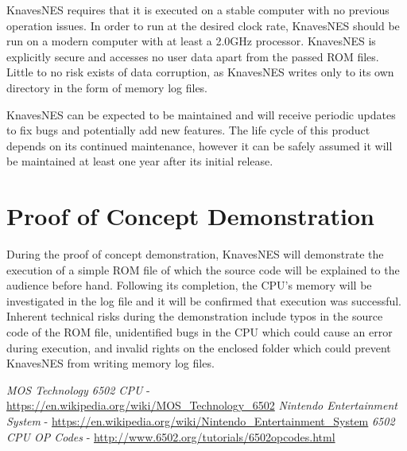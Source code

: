 \documentclass[12pt]{article}
\begin{document}
	KnavesNES requires that it is executed on a stable computer with no previous operation issues. In order to run at the desired clock rate, KnavesNES should be run on a modern computer with at least a 2.0GHz processor. KnavesNES is explicitly secure and accesses no user data apart from the passed ROM files. Little to no risk exists of data corruption, as KnavesNES writes only to its own directory in the form of memory log files. 

	KnavesNES can be expected to be maintained and will receive periodic updates to fix bugs and potentially add new features. The life cycle of this product depends on its continued maintenance, however it can be safely assumed it will be maintained at least one year after its initial release.
\section{Proof of Concept Demonstration}
	During the proof of concept demonstration, KnavesNES will demonstrate the execution of a simple ROM file of which the source code will be explained to the audience before hand. Following its completion, the CPU’s memory will be investigated in the log file and it will be confirmed that execution was successful. Inherent technical risks during the demonstration include typos in the source code of the ROM file, unidentified bugs in the CPU which could cause an error during execution, and invalid rights on the enclosed folder which could prevent KnavesNES from writing memory log files.
\clearpage

\hypertarget{refs}{}
\begin{thebibliography}{99}
 \emph{MOS Technology 6502 CPU} - \url{https://en.wikipedia.org/wiki/MOS_Technology_6502}
 \emph{Nintendo Entertainment System} - \url{https://en.wikipedia.org/wiki/Nintendo_Entertainment_System}
 \emph{6502 CPU OP Codes} - \url{http://www.6502.org/tutorials/6502opcodes.html}
\end{thebibliography}

\begin{versionhistory}
\end{versionhistory}
\end{document}
